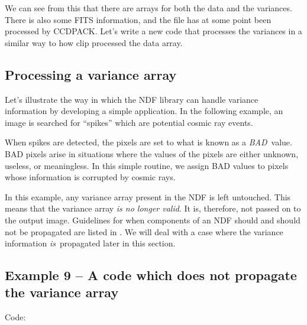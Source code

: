 \documentclass[11pt,nolof]{starlink}
\begin{document}
We can see from this that there are arrays for both the data and the
variances. There is also some FITS information, and the file has at some
point been processed by CCDPACK. Let's write a new code that processes the
variances in a similar way to how clip processed the data array.

\subsection{Processing a variance array}

Let's illustrate the way in which the NDF library can handle variance
information by developing a simple application. In the following example,
an image is searched for ``spikes'' which are potential cosmic ray events.

When spikes are detected, the pixels are set to what is known as a
\emph{BAD}\, value. BAD pixels arise in situations where the values of the pixels
are either unknown, useless, or meaningless. In this simple routine, we
assign BAD values to pixels whose information is corrupted by cosmic rays.

In this example, any variance array present in the NDF is left untouched.
This means that the variance array \emph{is no longer valid}. It is,
therefore, not passed on to the output image. Guidelines for when
components of an NDF should and should not be propagated are listed in
. We will deal with a case where the variance
information \emph{is}\, propagated later in this section.

\subsection{Example 9 -- A code which does not propagate the variance array}

Code:
\end{document}

